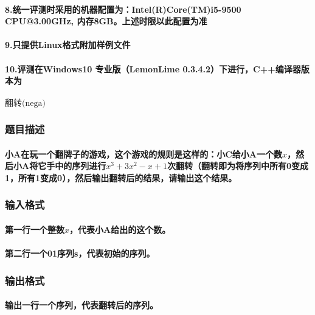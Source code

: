 \documentclass[final,11pt,oneside,UTF8]{report}
\begin{document}
\begin{spacing}{0}
    \paragraph{8.统一评测时采用的机器配置为：Intel(R)Core(TM)i5-9500 CPU@3.00GHz,
        内存8GB。上述时限以此配置为准}
    \paragraph{9.只提供Linux格式附加样例文件}
    \paragraph{10.评测在Windows10 专业版（LemonLime 0.3.4.2）下进行，C++编译器版本为}
    \paragraph{}
\end{spacing}
\newpage
\centerline{\LARGE{$\textbf{翻转}\text{(nega)}$}}
\subsubsection{题目描述}
\paragraph{
    小A在玩一个翻牌子的游戏，这个游戏的规则是这样的：小C给小A一个数$x$，然后小A将它手中的序列进行$x^3+3x^2-x+1$次翻转（翻转即为将序列中所有0变成1，所有1变成0），然后输出翻转后的结果，请输出这个结果。
}
\subsubsection{输入格式}
\paragraph{
    第一行一个整数$x$，代表小A给出的这个数。
}
\paragraph{
    第二行一个01序列s，代表初始的序列。
}
\subsubsection{输出格式}
\paragraph{
    输出一行一个序列，代表翻转后的序列。
}
\end{document}
